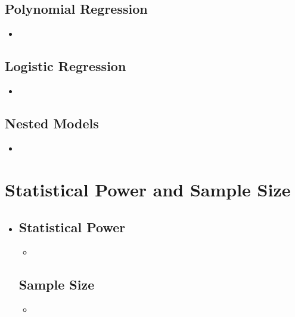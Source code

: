 \begin{itemize}
  \subsection{Polynomial Regression}
  \begin{itemize}
    \item 
  \end{itemize}
  
  \subsection{Logistic Regression}
  \begin{itemize}
    \item 
  \end{itemize}

  \subsection{Nested Models}
  \begin{itemize}
    \item 
  \end{itemize}
  
\end{itemize}

\section{Statistical Power and Sample Size}
\begin{itemize}
  \item []
  
  \subsection{Statistical Power}
  \begin{itemize}
    \item 
  \end{itemize}

  \subsection{Sample Size}
  \begin{itemize}
    \item 
  \end{itemize}
  
\end{itemize}
